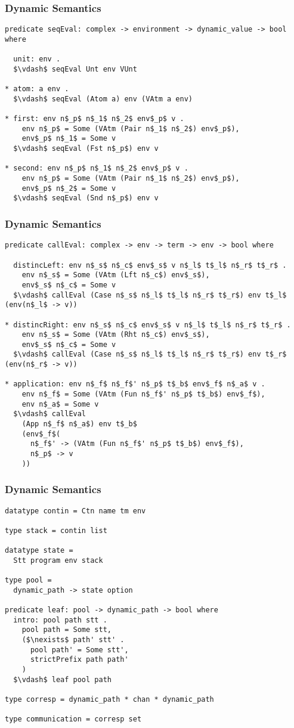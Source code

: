 \documentclass{beamer}
\begin{document}
\begin{frame}[fragile]
	\frametitle{Dynamic Semantics}
\begin{lstlisting}[language=logic, mathescape]
predicate seqEval: complex -> environment -> dynamic_value -> bool where

  unit: env . 
  $\vdash$ seqEval Unt env VUnt

* atom: a env .
  $\vdash$ seqEval (Atom a) env (VAtm a env)

* first: env n$_p$ n$_1$ n$_2$ env$_p$ v . 
    env n$_p$ = Some (VAtm (Pair n$_1$ n$_2$) env$_p$),
    env$_p$ n$_1$ = Some v
  $\vdash$ seqEval (Fst n$_p$) env v

* second: env n$_p$ n$_1$ n$_2$ env$_p$ v . 
    env n$_p$ = Some (VAtm (Pair n$_1$ n$_2$) env$_p$), 
    env$_p$ n$_2$ = Some v 
  $\vdash$ seqEval (Snd n$_p$) env v
\end{lstlisting}
\end{frame}

\begin{frame}[fragile]
	\frametitle{Dynamic Semantics}
\begin{lstlisting}[language=logic, mathescape]
predicate callEval: complex -> env -> term -> env -> bool where

  distincLeft: env n$_s$ n$_c$ env$_s$ v n$_l$ t$_l$ n$_r$ t$_r$ .
    env n$_s$ = Some (VAtm (Lft n$_c$) env$_s$),
    env$_s$ n$_c$ = Some v
  $\vdash$ callEval (Case n$_s$ n$_l$ t$_l$ n$_r$ t$_r$) env t$_l$ (env(n$_l$ -> v))

* distincRight: env n$_s$ n$_c$ env$_s$ v n$_l$ t$_l$ n$_r$ t$_r$ .
    env n$_s$ = Some (VAtm (Rht n$_c$) env$_s$),
    env$_s$ n$_c$ = Some v
  $\vdash$ callEval (Case n$_s$ n$_l$ t$_l$ n$_r$ t$_r$) env t$_r$ (env(n$_r$ -> v))

* application: env n$_f$ n$_f$' n$_p$ t$_b$ env$_f$ n$_a$ v .
    env n$_f$ = Some (VAtm (Fun n$_f$' n$_p$ t$_b$) env$_f$),
    env n$_a$ = Some v
  $\vdash$ callEval
    (App n$_f$ n$_a$) env t$_b$
    (env$_f$(
      n$_f$' -> (VAtm (Fun n$_f$' n$_p$ t$_b$) env$_f$),
      n$_p$ -> v
    ))
\end{lstlisting}
\end{frame}

\begin{frame}[fragile]
	\frametitle{Dynamic Semantics}
\begin{lstlisting}[language=logic, mathescape]
datatype contin = Ctn name tm env

type stack = contin list

datatype state =
  Stt program env stack 

type pool =
  dynamic_path -> state option

predicate leaf: pool -> dynamic_path -> bool where
  intro: pool path stt .
    pool path = Some stt,
    ($\nexists$ path' stt' .
      pool path' = Some stt',
      strictPrefix path path'
    )
  $\vdash$ leaf pool path

type corresp = dynamic_path * chan * dynamic_path

type communication = corresp set 
\end{lstlisting}
\end{frame}
\end{document}
